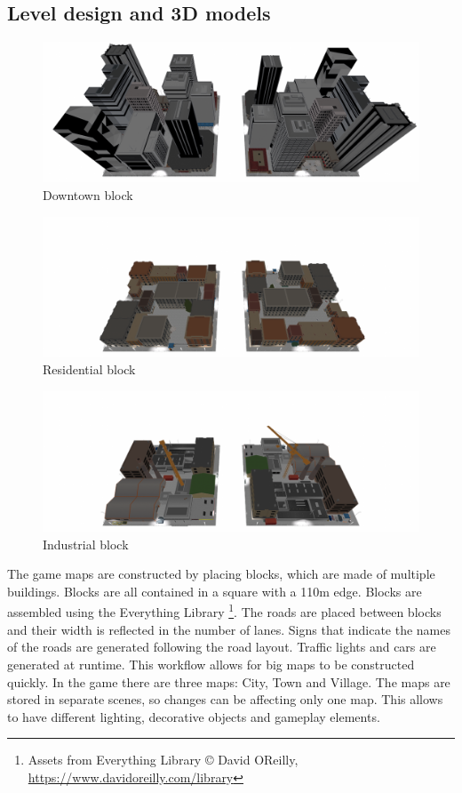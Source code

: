 \documentclass[12pt]{article}
\begin{document}
\subsection{Level design and 3D models}
\begin{figure}[H]
\includegraphics[width=\textwidth]{blockskyscraper}
\caption{Downtown block}
\end{figure}
\begin{figure}[H]
\includegraphics[width=\textwidth]{blockresidential}
\caption{Residential block}
\end{figure}
\begin{figure}[H]
\includegraphics[width=\textwidth]{blockcargo}
\caption{Industrial block}
\end{figure}
The game maps are constructed by placing blocks, which are made of multiple buildings. Blocks are all contained in a square with a 110m edge. Blocks are assembled using the Everything Library \footnote{Assets from Everything Library © David OReilly, \url{https://www.davidoreilly.com/library}}. The roads are placed between blocks and their width is reflected in the number of lanes. Signs that indicate the names of the roads are generated following the road layout. Traffic lights and cars are generated at runtime. This workflow allows for big maps to be constructed quickly. In the game there are three maps: City, Town and Village. The maps are stored in separate scenes, so changes can be affecting only one map. This allows to have different lighting, decorative objects and gameplay elements.
\end{document}

